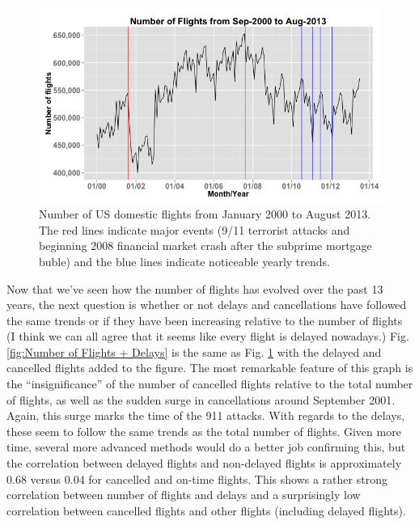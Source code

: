 \documentclass[11pt,twoside,titlepage]{article}
\begin{document}
\begin{figure}[h!]
        \centering
                \includegraphics[width=15cm]{Number_of_Flights1.png}
        \caption{Number of US domestic flights from January 2000 to August 2013. The red lines indicate major events (9/11 terrorist attacks and beginning 2008 financial market crash after the subprime mortgage buble) and the blue lines indicate noticeable yearly trends.}\label{fig:Number of Flights}
\end{figure}

Now that we've seen how the number of flights has evolved over the past 13 years, the next question is whether or not delays and cancellations have followed the same trends or if they have been increasing relative to the number of flights (I think we can all agree that it seems like every flight is delayed nowadays.) Fig. \ref{fig:Number of Flights + Delays} is the same as Fig. \ref{fig:Number of Flights} with the delayed and cancelled flights added to the figure. The most remarkable feature of this graph is the ``insignificance'' of the number of cancelled flights relative to the total number of flights, as well as the sudden surge in cancellations around September 2001. Again, this surge marks the time of the 911 attacks. With regards to the delays, these seem to follow the same trends as the total number of flights. Given more time, several more advanced methods would do a better job confirming this, but the correlation between delayed flights and non-delayed flights is approximately $0.68$ versus $0.04$ for cancelled and on-time flights. This shows a rather strong correlation between number of flights and delays and a surprisingly low correlation between cancelled flights and other flights (including delayed flights).
\end{document}
